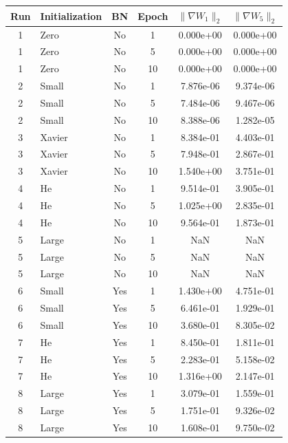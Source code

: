 \begin{tabular}{clcccc}
\toprule
Run & Initialization & BN & Epoch & $\|\nabla W_1\|_2$ & $\|\nabla W_5\|_2$ \\
\midrule
1 & Zero & No & 1 & 0.000e+00 & 0.000e+00 \\
1 & Zero & No & 5 & 0.000e+00 & 0.000e+00 \\
1 & Zero & No & 10 & 0.000e+00 & 0.000e+00 \\
\midrule
2 & Small & No & 1 & 7.876e-06 & 9.374e-06 \\
2 & Small & No & 5 & 7.484e-06 & 9.467e-06 \\
2 & Small & No & 10 & 8.388e-06 & 1.282e-05 \\
\midrule
3 & Xavier & No & 1 & 8.384e-01 & 4.403e-01 \\
3 & Xavier & No & 5 & 7.948e-01 & 2.867e-01 \\
3 & Xavier & No & 10 & 1.540e+00 & 3.751e-01 \\
\midrule
4 & He & No & 1 & 9.514e-01 & 3.905e-01 \\
4 & He & No & 5 & 1.025e+00 & 2.835e-01 \\
4 & He & No & 10 & 9.564e-01 & 1.873e-01 \\
\midrule
5 & Large & No & 1 & NaN & NaN \\
5 & Large & No & 5 & NaN & NaN \\
5 & Large & No & 10 & NaN & NaN \\
\midrule
6 & Small & Yes & 1 & 1.430e+00 & 4.751e-01 \\
6 & Small & Yes & 5 & 6.461e-01 & 1.929e-01 \\
6 & Small & Yes & 10 & 3.680e-01 & 8.305e-02 \\
\midrule
7 & He & Yes & 1 & 8.450e-01 & 1.811e-01 \\
7 & He & Yes & 5 & 2.283e-01 & 5.158e-02 \\
7 & He & Yes & 10 & 1.316e+00 & 2.147e-01 \\
\midrule
8 & Large & Yes & 1 & 3.079e-01 & 1.559e-01 \\
8 & Large & Yes & 5 & 1.751e-01 & 9.326e-02 \\
8 & Large & Yes & 10 & 1.608e-01 & 9.750e-02 \\
\bottomrule
\end{tabular}
